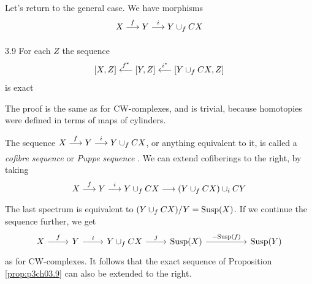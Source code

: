 \documentclass[../main]{subfiles}
\begin{document}
Let's return to the general case. We have morphisms \[X\lar{f}Y\lar{i} Y\cup_f CX\]

\begin{customprop}{3.9}\label{prop:p3ch03.9}
For each $Z$ the sequence \[[X,Z]\overset{f^\ast}{\longleftarrow} [Y,Z]\overset{i^\ast}{\longleftarrow} [Y\cup_f CX,Z]\]
is exact
\end{customprop}
The proof is the same as for CW-complexes, and is trivial, because homotopies were defined in terms of maps of cylinders.

The sequence $X\lar{f}Y\lar{i} Y\cup_f CX$, or anything equivalent to it, is called a \emph{cofibre sequence} or \emph{Puppe sequence}  . We can extend cofiberings to the right, by taking 
\[X\lar{f} Y\lar{i} Y\cup_f CX \lar{} (Y\cup_f CX)\cup_i CY \]
The last spectrum is equivalent to $(Y\cup_f CX)/Y = \mathrm{Susp}(X)$. If we continue the sequence further, we get
\[\begin{tikzcd}
	X & Y & {Y\cup_f CX} & {\te{Susp}(X)} && {\te{Susp}(Y)}
	\arrow["f", from=1-1, to=1-2]
	\arrow["i", from=1-2, to=1-3]
	\arrow["j", from=1-3, to=1-4]
	\arrow["{-\te{Susp}(f)}", from=1-4, to=1-6]
\end{tikzcd}\]
as for CW-complexes. It follows that the exact sequence of Proposition \ref{prop:p3ch03.9} can also be extended to the right.
\end{document}
